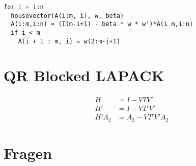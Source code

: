 \begin{lstlisting}
for i = i:n
  housevector(A(i:m, i), w, beta)
  A(i:m,i:n) = (I(m-i+1) - beta * w * w')*A(i m,i:n)
  if i < m
    A(i + 1 : m, i) = w(2:m-i+1)
\end{lstlisting}



\section{QR Blocked LAPACK}

\begin{align}
	H &= I - VTV'\\
	H' &= I - VT'V'\\ 
	H'A_2 &= A_2 - VT'V'A_2
\end{align}

\section{Fragen}



